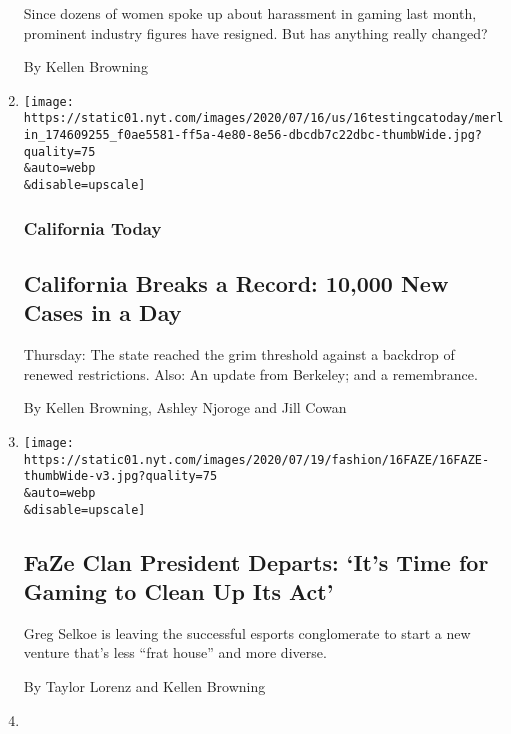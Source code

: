 \begin{enumerate}
  Since dozens of women spoke up about harassment in gaming last month,
  prominent industry figures have resigned. But has anything really
  changed?

  By Kellen Browning
\item
  \href{/2020/07/16/us/california-coronavirus-cases.html}{}

  \texttt{[image: https://static01.nyt.com/images/2020/07/16/us/16testingcatoday/merlin\_174609255\_f0ae5581-ff5a-4e80-8e56-dbcdb7c22dbc-thumbWide.jpg?quality=75\\\&auto=webp\\\&disable=upscale]}

  \hypertarget{california-today}{%
  \subsubsection{California Today}\label{california-today}}

  \hypertarget{california-breaks-a-record-10000-new-cases-in-a-day}{%
  \subsection{California Breaks a Record: 10,000 New Cases in a
  Day}\label{california-breaks-a-record-10000-new-cases-in-a-day}}

  Thursday: The state reached the grim threshold against a backdrop of
  renewed restrictions. Also: An update from Berkeley; and a
  remembrance.

  By Kellen Browning, Ashley Njoroge and Jill Cowan
\item
  \href{/2020/07/16/style/xset-gaming-lifestyle-company-faze-clan.html}{}

  \texttt{[image: https://static01.nyt.com/images/2020/07/19/fashion/16FAZE/16FAZE-thumbWide-v3.jpg?quality=75\\\&auto=webp\\\&disable=upscale]}

  \hypertarget{faze-clan-president-departs-its-time-for-gaming-to-clean-up-its-act}{%
  \subsection{FaZe Clan President Departs: `It's Time for Gaming to
  Clean Up Its
  Act'}\label{faze-clan-president-departs-its-time-for-gaming-to-clean-up-its-act}}

  Greg Selkoe is leaving the successful esports conglomerate to start a
  new venture that's less ``frat house'' and more diverse.

  By Taylor Lorenz and Kellen Browning
\item
  \href{/live/2020/07/09/business/stock-market-today-coronavirus/personal-computer-market-rebounds-in-second-quarter}{}


\end{enumerate}
